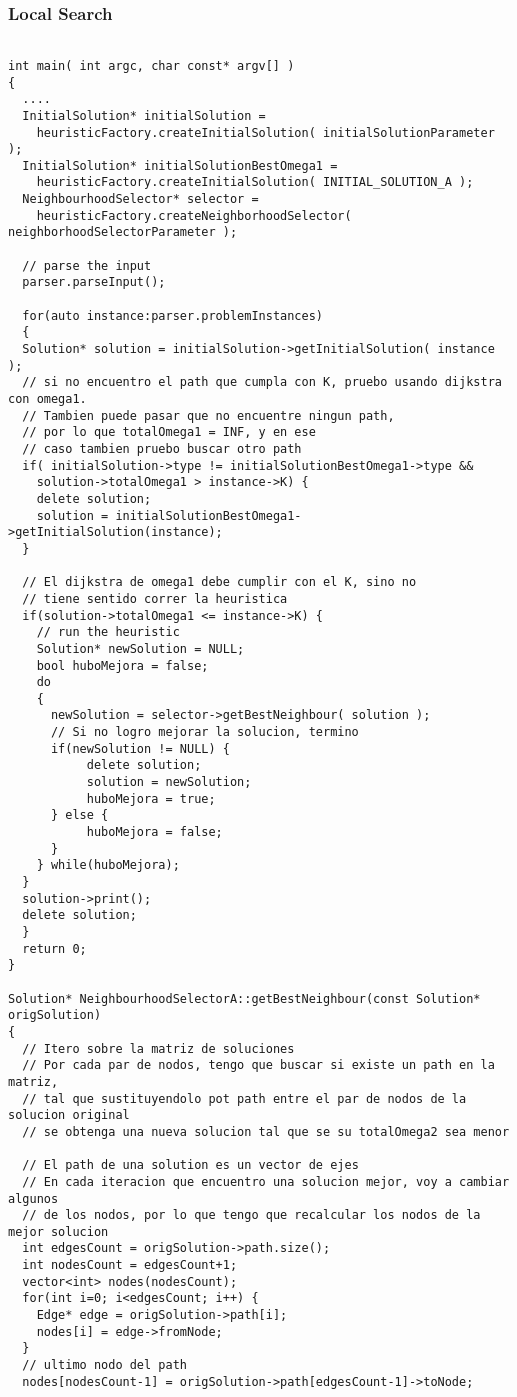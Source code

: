 \subsubsection{Local Search}
\small
\hangindent=0.7cm\begin{verbatim}

int main( int argc, char const* argv[] )
{
  ....
  InitialSolution* initialSolution =  
    heuristicFactory.createInitialSolution( initialSolutionParameter );
  InitialSolution* initialSolutionBestOmega1 =  
    heuristicFactory.createInitialSolution( INITIAL_SOLUTION_A );
  NeighbourhoodSelector* selector = 
    heuristicFactory.createNeighborhoodSelector( neighborhoodSelectorParameter );
  
  // parse the input
  parser.parseInput();  

  for(auto instance:parser.problemInstances)
  {
  Solution* solution = initialSolution->getInitialSolution( instance );
  // si no encuentro el path que cumpla con K, pruebo usando dijkstra con omega1.
  // Tambien puede pasar que no encuentre ningun path, 
  // por lo que totalOmega1 = INF, y en ese 
  // caso tambien pruebo buscar otro path
  if( initialSolution->type != initialSolutionBestOmega1->type && 
    solution->totalOmega1 > instance->K) {
    delete solution;
    solution = initialSolutionBestOmega1->getInitialSolution(instance);
  }
  
  // El dijkstra de omega1 debe cumplir con el K, sino no 
  // tiene sentido correr la heuristica
  if(solution->totalOmega1 <= instance->K) {
    // run the heuristic
    Solution* newSolution = NULL;  
    bool huboMejora = false;
    do
    {
      newSolution = selector->getBestNeighbour( solution );
      // Si no logro mejorar la solucion, termino    
      if(newSolution != NULL) {
           delete solution;
           solution = newSolution;      
           huboMejora = true;  
      } else {            
           huboMejora = false;
      }    
    } while(huboMejora);
  } 
  solution->print();
  delete solution;
  }
  return 0;
}

Solution* NeighbourhoodSelectorA::getBestNeighbour(const Solution* origSolution)
{ 
  // Itero sobre la matriz de soluciones
  // Por cada par de nodos, tengo que buscar si existe un path en la matriz, 
  // tal que sustituyendolo pot path entre el par de nodos de la solucion original 
  // se obtenga una nueva solucion tal que se su totalOmega2 sea menor
  
  // El path de una solution es un vector de ejes   
  // En cada iteracion que encuentro una solucion mejor, voy a cambiar algunos 
  // de los nodos, por lo que tengo que recalcular los nodos de la mejor solucion       
  int edgesCount = origSolution->path.size();
  int nodesCount = edgesCount+1;
  vector<int> nodes(nodesCount); 
  for(int i=0; i<edgesCount; i++) {
    Edge* edge = origSolution->path[i];
    nodes[i] = edge->fromNode;
  }
  // ultimo nodo del path
  nodes[nodesCount-1] = origSolution->path[edgesCount-1]->toNode; 
    

\end{verbatim}
